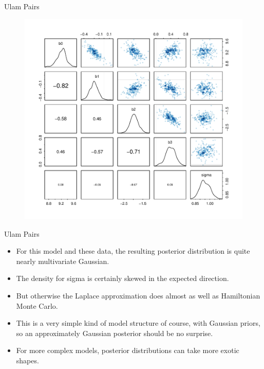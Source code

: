 \documentclass[handout]{beamer}
\begin{document}
\begin{frame}{Ulam Pairs}



 \begin{figure}[h!]
	\centering
	\includegraphics[scale=0.55]{pics/MCMC_pairs.pdf}
	\end{figure} 



\end{frame}


\begin{frame}[fragile]{Ulam Pairs}
\scriptsize{


\begin{itemize}


\item For this model and these data, the resulting posterior distribution is quite nearly multivariate Gaussian.
\item The density for sigma is certainly skewed in the expected direction. \item But otherwise the Laplace approximation does almost as well as Hamiltonian Monte Carlo.
\item This is a very simple kind of model structure of course, with Gaussian priors, so an approximately Gaussian posterior should be no surprise. 
\item For more complex models, posterior distributions can take more exotic shapes.

 \end{itemize}




} 
\end{frame}
\end{document}
